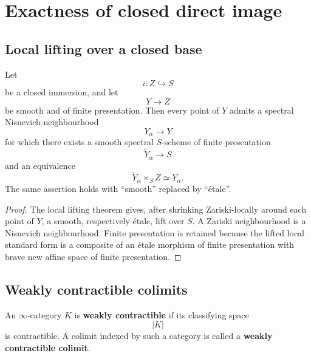 \section{Exactness of closed direct image}
\label{sec:exactness-closed-direct-image}

\subsection{Local lifting over a closed base}

\begin{proposition}
\label{prop:local-lifting-smooth-test-schemes}
Let
\[
    i
    \colon
    Z
    \hookrightarrow
    S
\]
be a closed immersion, and let
\[
    Y
    \longrightarrow
    Z
\]
be smooth and of finite presentation.  Then every point of \(Y\)
admits a spectral Nisnevich neighbourhood
\[
    Y_\alpha
    \longrightarrow
    Y
\]
for which there exists a smooth spectral \(S\)-scheme of finite
presentation
\[
    \widetilde Y_\alpha
    \longrightarrow
    S
\]
and an equivalence
\[
    \widetilde Y_\alpha\times_SZ
    \simeq
    Y_\alpha.
\]
The same assertion holds with ``smooth'' replaced by ``étale''.
\end{proposition}

\begin{proof}
The local lifting theorem
gives, after shrinking Zariski-locally around each point of \(Y\), a
smooth, respectively étale, lift over \(S\).  A Zariski neighbourhood
is a Nisnevich neighbourhood.  Finite presentation is retained because
the lifted local standard form is a composite of an étale morphism of
finite presentation with brave new affine space of finite presentation.
\end{proof}

\subsection{Weakly contractible colimits}

\begin{definition}
\label{def:weakly-contractible-indexing-category}
An \(\infty\)-category \(K\) is \textbf{weakly contractible} if its
classifying space
\[
    |K|
\]
is contractible.  A colimit indexed by such a category is called a
\textbf{weakly contractible colimit}.
\end{definition}

